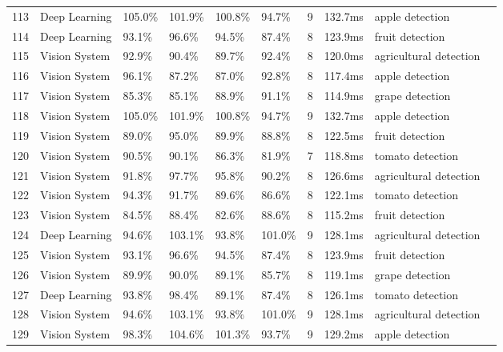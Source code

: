 \begin{table*}[htbp]
\begin{tabular}{p{}p{}p{}p{}p{}p{}p{}p{}p{}p{}}
 113 & Deep Learning & 105.0\% & 101.9\% & 100.8\% & 94.7\% & 9 & 132.7ms & apple detection & \cite{majeed2020deep} \\
 114 & Deep Learning & 93.1\% & 96.6\% & 94.5\% & 87.4\% & 8 & 123.9ms & fruit detection & \cite{altaheri2019date} \\
 115 & Vision System & 92.9\% & 90.4\% & 89.7\% & 92.4\% & 8 & 120.0ms & agricultural detection & \cite{wang2016localisation} \\
 116 & Vision System & 96.1\% & 87.2\% & 87.0\% & 92.8\% & 8 & 117.4ms & apple detection & \cite{si2015location} \\
 117 & Vision System & 85.3\% & 85.1\% & 88.9\% & 91.1\% & 8 & 114.9ms & grape detection & \cite{luo2016vision} \\
 118 & Vision System & 105.0\% & 101.9\% & 100.8\% & 94.7\% & 9 & 132.7ms & apple detection & \cite{kang2020real} \\
 119 & Vision System & 89.0\% & 95.0\% & 89.9\% & 88.8\% & 8 & 122.5ms & fruit detection & \cite{barnea2016colour} \\
 120 & Vision System & 90.5\% & 90.1\% & 86.3\% & 81.9\% & 7 & 118.8ms & tomato detection & \cite{goel2015fuzzy} \\
 121 & Vision System & 91.8\% & 97.7\% & 95.8\% & 90.2\% & 8 & 126.6ms & agricultural detection & \cite{lin2019field} \\
 122 & Vision System & 94.3\% & 91.7\% & 89.6\% & 86.6\% & 8 & 122.1ms & tomato detection & \cite{zhao2016robust} \\
 123 & Vision System & 84.5\% & 88.4\% & 82.6\% & 88.6\% & 8 & 115.2ms & fruit detection & \cite{longsheng2015kiwifruit} \\
 124 & Deep Learning & 94.6\% & 103.1\% & 93.8\% & 101.0\% & 9 & 128.1ms & agricultural detection & \cite{mao2020automatic} \\
 125 & Vision System & 93.1\% & 96.6\% & 94.5\% & 87.4\% & 8 & 123.9ms & fruit detection & \cite{ge2019fruit} \\
 126 & Vision System & 89.9\% & 90.0\% & 89.1\% & 85.7\% & 8 & 119.1ms & grape detection & \cite{perez2018pattern} \\
 127 & Deep Learning & 93.8\% & 98.4\% & 89.1\% & 87.4\% & 8 & 126.1ms & tomato detection & \cite{zhang2018deep} \\
 128 & Vision System & 94.6\% & 103.1\% & 93.8\% & 101.0\% & 9 & 128.1ms & agricultural detection & \cite{peng2020semantic} \\
 129 & Vision System & 98.3\% & 104.6\% & 101.3\% & 93.7\% & 9 & 129.2ms & apple detection & \cite{li2021novel} \\

\end{tabular}
\end{table*}
